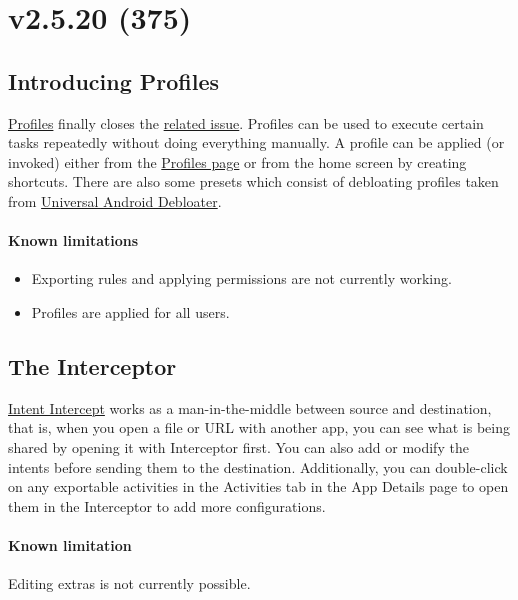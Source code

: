 \section{v2.5.20 (375)}\label{sec:v2.5.20-(375)}

\subsection{Introducing Profiles}\label{subsec:introducing-profiles}
\hyperref[sec:profile-page]{Profiles} finally closes the
\href{https://github.com/MuntashirAkon/AppManager/issues/72}{related issue}. Profiles can be used to execute certain
tasks repeatedly without doing everything manually. A profile can be applied (or invoked) either from the
\hyperref[sec:profiles-page]{Profiles page} or from the home screen by creating shortcuts. There are also some presets
which consist of debloating profiles taken from
\href{https://gitlab.com/W1nst0n/universal-android-debloater}{Universal Android Debloater}.

\paragraph{Known limitations}
\begin{itemize}
    \item Exporting rules and applying permissions are not currently working.
    \item Profiles are applied for all users.
\end{itemize}

\subsection{The Interceptor}\label{subsec:the-interceptor}
\href{https://github.com/MuntashirAkon/intent-intercept}{Intent Intercept} works as a man-in-the-middle between source
and destination, that is, when you open a file or URL with another app, you can see what is being shared by opening it
with Interceptor first. You can also add or modify the intents before sending them to the destination. Additionally,
you can double-click on any exportable activities in the Activities tab in the App Details page to open them in the
Interceptor to add more configurations.

\paragraph{Known limitation} Editing extras is not currently possible.

